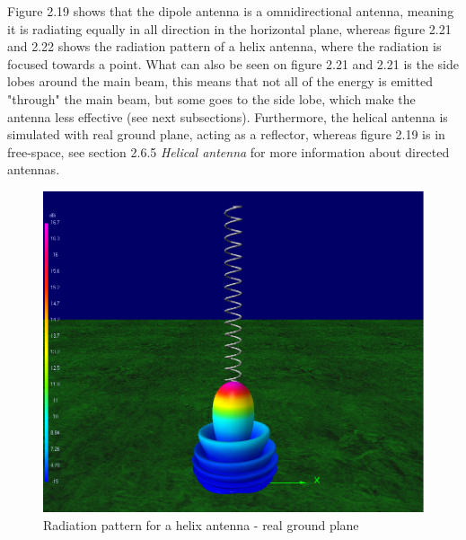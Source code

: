 Figure 2.19 shows that the dipole antenna is a omnidirectional antenna, meaning it is radiating equally in all direction in the horizontal plane, whereas figure 2.21 and 2.22 shows the radiation pattern of a helix antenna, where the radiation is focused towards a point. What can also be seen on figure 2.21 and 2.21 is the side lobes around the main beam, this means that not all of the energy is emitted "through" the main beam, but some goes to the side lobe, which make the antenna less effective (see next subsections). Furthermore, the helical antenna is simulated with real ground plane, acting as a reflector, whereas figure 2.19 is in free-space, see section 2.6.5 \textit{Helical antenna} for more information about directed antennas. 

\begin{figure}[h]
\centering
\includegraphics[scale=0.45]{figures/HelixRad.PNG}
\caption{Radiation pattern for a helix antenna - real ground plane }
\end{figure}

